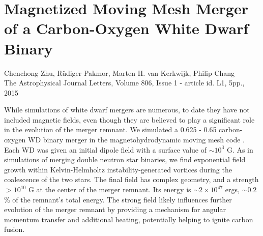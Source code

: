 \chapter{Magnetized Moving Mesh Merger of a Carbon-Oxygen White Dwarf Binary}
\label{ch:ch4}

\begin{center}
\begin{minipage}[c]{4.75in}
Chenchong Zhu, R\"{u}diger Pakmor, Marten H. van Kerkwijk, Philip Chang\\
The Astrophysical Journal Letters, Volume 806, Issue 1 - article id. L1, 5pp., 2015 \citep{zhu+15}
\vspace{2em}
\end{minipage}
\end{center}

While simulations of white dwarf mergers are numerous, to date they have not included magnetic fields, even though they are believed to play a significant role in the evolution of the merger remnant.  We simulated a 0.625 - 0.65 {\Msun} carbon-oxygen WD binary merger in the magnetohydrodynamic moving mesh code {\arepo}.  Each WD was given an initial dipole field with a surface value of $\sim10^3$ G.  As in simulations of merging double neutron star binaries, we find exponential field growth within Kelvin-Helmholtz instability-generated vortices during the coalescence of the two stars.  The final field has complex geometry, and a strength $>10^{10}$ G at the center of the merger remnant.  Its energy is $\sim2\times10^{47}$ ergs, $\sim0.2$\% of the remnant's total energy.  The strong field likely influences further evolution of the merger remnant by providing a mechanism for angular momentum transfer and additional heating, potentially helping to ignite carbon fusion.

